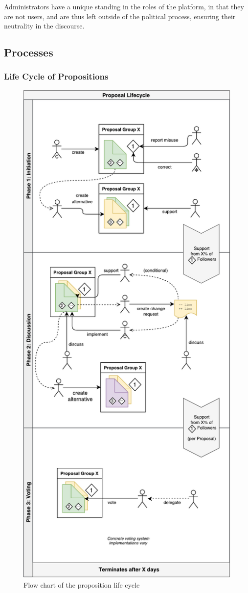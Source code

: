 Administrators have a unique standing in the roles of the platform, in that they are not users, and are thus left outside of the political process, ensuring their neutrality in the discourse.

\subsection{Processes}

\subsubsection{Life Cycle of Propositions}
\label{ssec:Model_Propositions_Life}
\begin{figure}[!b]
\centering
\includegraphics[height=0.6\paperheight]{img/lifecycle_flow_v0.pdf}
\caption{Flow chart of the proposition life cycle}
\label{fig:proplife}
\end{figure}

